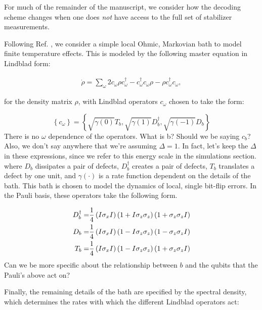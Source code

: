 \documentclass[twocolumn,superscriptaddress,aps,prb,floatfix]{revtex4-1}
\newcommand{\MS}[1]{{\color{mauve} {#1}}}
\begin{document}
For much of the remainder of the manuscript, we consider how the decoding scheme changes when one does \emph{not} have access to the full set of stabilizer measurements.

Following Ref. \cite{Freeman2016}, we consider a simple local Ohmic, Markovian bath to model finite temperature effects.  This is modeled by the following master equation in Lindblad form:

\begin{align}
\dot{\rho }=\sum_{\omega }{2c_{\omega }\rho c^{\dagger }_\omega}-c^{\dagger }_{\omega }c_{\omega }\rho -\rho c^{\dagger }_{\omega }c_{\omega }, \label{eq:Lindblad}
\end{align}

for the density matrix $\rho$, with Lindblad operators $c_{\omega }$ chosen to take the form:

\begin{equation}
\left \{ c_\omega \right \} = \left \{ \sqrt{\gamma(0)} T_{b}, \sqrt{\gamma(1)} D^\dagger_{b}, \sqrt{\gamma(-1)} D_{b} \right\} 
\end{equation}
\MS{There is no $\omega$ dependence of the operators. What is b? Should we be saying $c_b$? Also, we don't say anywhere that we're assuming $\Delta=1$. In fact, let's keep the $\Delta$ in these expressions, since we refer to this energy scale in the simulations section.}
where $D_{b}$ dissipates a pair of defects,  $D^\dagger_{b}$ creates a pair of defects, $T_{b}$ translates a defect by one unit, and $\gamma(\cdot)$ is a rate function dependent on the details of the bath.  This bath is chosen to model the dynamics of local, single bit-flip errors.  In the Pauli basis, these operators take the following form.

\begin{align}
D^\dagger_{b}= &\frac{1}{4} \left(I \sigma_x I \right)\left(1+I \sigma_z \sigma_z\right)\left(1+ \sigma_z \sigma_z I\right) \notag \\
D_{b}= &\frac{1}{4} \left(I \sigma_x I \right)\left(1-I \sigma_z \sigma_z\right)\left(1-\sigma_z \sigma_z I\right) \notag \\
T_{b}= &\frac{1}{4} \left(I \sigma_x I \right)\left(1-I \sigma_z \sigma_z\right)\left(1+ \sigma_z \sigma_z I\right) \label{eq:LindbladDef}
\end{align}
\MS{Can we be more specific about the relationship between $b$ and the qubits that the Pauli's above act on?}

Finally, the remaining details of the bath are specified by the spectral density, which determines the rates with which the different Lindblad operators act:
\end{document}
